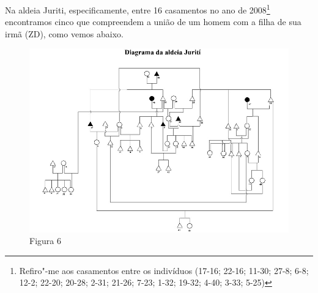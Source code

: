 Na aldeia Juriti, especificamente, entre 16 casamentos no ano de
2008\footnote{Refiro"-me aos casamentos entre os indivíduos (17-16;
  22-16; 11-30; 27-8; 6-8; 12-2; 22-20; 20-28; 2-31; 21-26; 7-23; 1-32;
  19-32; 4-40; 3-33; 5-25)} encontramos cinco que compreendem a união de
um homem com a filha de sua irmã (ZD), como vemos abaixo.



\begin{figure}[H]
\centering
  \includegraphics[width=\textwidth]{./imgs/Figura_6}
\caption{Figura 6}
\end{figure}


